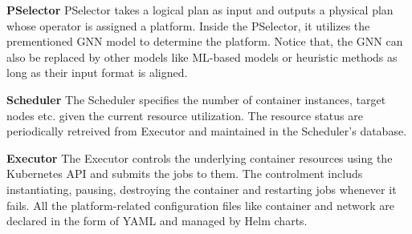 \textbf{PSelector}   PSelector takes a logical plan as input and outputs a physical plan whose operator is assigned a platform. Inside the PSelector, it utilizes the prementioned GNN model to determine the platform. Notice that, the GNN can also be replaced by other models like ML-based models or heuristic methods as long as their input format is aligned.

\textbf{Scheduler}   The Scheduler specifies the number of container instances, target nodes etc. given the current resource utilization. The resource status are periodically retreived from Executor and maintained in the Scheduler's database.

\textbf{Executor}    The Executor controls the underlying container resources using the Kubernetes API and submits the jobs to them. The controlment includs instantiating, pausing, destroying the container and restarting jobs whenever it fails. All the platform-related configuration files like container and network are declared in the form of YAML and managed by Helm charts.
\fi






